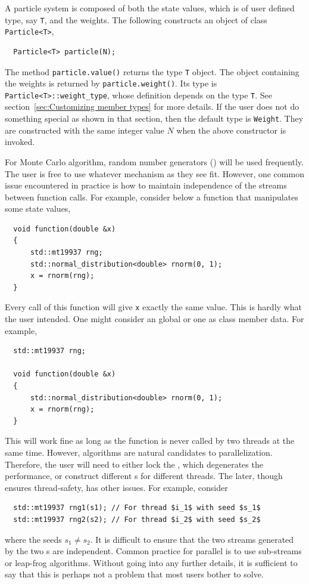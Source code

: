 A particle system is composed of both the state values, which is of user
defined type, say \verb|T|, and the weights. The following constructs an object
of class \verb|Particle<T>|,
\begin{Verbatim}
  Particle<T> particle(N);
\end{Verbatim}
The method \verb|particle.value()| returns the type \verb|T| object. The object
containing the weights is returned by \verb|particle.weight()|. Its type is
\verb|Particle<T>::weight_type|, whose definition depends on the type \verb|T|.
See section~\ref{sec:Customizing member types} for more details. If the user
does not do something special as shown in that section, then the default type
is \verb|Weight|. They are constructed with the same integer value $N$ when the
above constructor is invoked.

For Monte Carlo algorithm, random number generators (\rng) will be used
frequently. The user is free to use whatever \rng mechanism as they see fit.
However, one common issue encountered in practice is how to maintain
independence of the \rng streams between function calls. For example, consider
below a function that manipulates some state values,
\begin{Verbatim}
  void function(double &x)
  {
      std::mt19937 rng;
      std::normal_distribution<double> rnorm(0, 1);
      x = rnorm(rng);
  }
\end{Verbatim}
Every call of this function will give \verb|x| exactly the same value. This is
hardly what the user intended. One might consider an global \rng or one as
class member data. For example,
\begin{Verbatim}
  std::mt19937 rng;

  void function(double &x)
  {
      std::normal_distribution<double> rnorm(0, 1);
      x = rnorm(rng);
  }
\end{Verbatim}
This will work fine as long as the function is never called by two threads at
the same time. However, \smc algorithms are natural candidates to
parallelization. Therefore, the user will need to either lock the \rng, which
degenerates the performance, or construct different \rng{}s for different
threads. The later, though ensures thread-safety, has other issues. For
example, consider
\begin{Verbatim}
  std::mt19937 rng1(s1); // For thread $i_1$ with seed $s_1$
  std::mt19937 rng2(s2); // For thread $i_2$ with seed $s_2$
\end{Verbatim}
where the seeds $s_1 \ne s_2$. It is difficult to ensure that the two streams
generated by the two \rng{}s are independent. Common practice for parallel \rng
is to use sub-streams or leap-frog algorithms. Without going into any further
details, it is sufficient to say that this is perhaps not a problem that most
users bother to solve.

